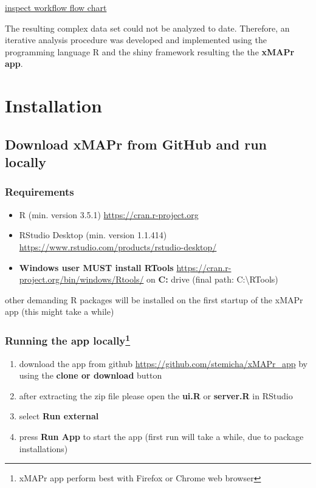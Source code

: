 \documentclass[]{book}
\providecommand{\tightlist}{%
  \setlength{\itemsep}{0pt}\setlength{\parskip}{0pt}}
\let\rmarkdownfootnote\footnote%
\def\footnote{\protect\rmarkdownfootnote}
\theoremstyle{definition}
\theoremstyle{definition}
\theoremstyle{definition}
\theoremstyle{remark}
\begin{document}
\href{figures/serological_assay_workflow.png}{inspect workflow flow
chart}

The resulting complex data set could not be analyzed to date. Therefore,
an iterative analysis procedure was developed and implemented using the
programming language R and the shiny framework resulting the the
\textbf{xMAPr app}.

\chapter{Installation}\label{installation}

\section{Download xMAPr from GitHub and run
locally}\label{download-xmapr-from-github-and-run-locally}

\subsection{Requirements}\label{requirements}

\begin{itemize}
\tightlist
\item
  R (min. version 3.5.1) \url{https://cran.r-project.org}
\item
  RStudio Desktop (min. version 1.1.414)
  \url{https://www.rstudio.com/products/rstudio-desktop/}
\item
  \textbf{Windows user MUST install RTools}
  \url{https://cran.r-project.org/bin/windows/Rtools/} on \textbf{C:}
  drive (final path: C:\textbackslash{}RTools)
\end{itemize}

other demanding R packages will be installed on the first startup of the
xMAPr app (this might take a while)

\subsection[Running the app locally]{\texorpdfstring{Running the app
locally\footnote{xMAPr app perform best with Firefox or Chrome web
  browser}}{Running the app locally}}\label{running-the-app-locally}

\begin{enumerate}
\def\labelenumi{\arabic{enumi}.}
\tightlist
\item
  download the app from github
  \url{https://github.com/stemicha/xMAPr_app} by using the \textbf{clone
  or download} button
\item
  after extracting the zip file please open the \textbf{ui.R} or
  \textbf{server.R} in RStudio
\item
  select \textbf{Run external}
\item
  press \textbf{Run App} to start the app (first run will take a while,
  due to package installations)
\end{enumerate}
\end{document}
